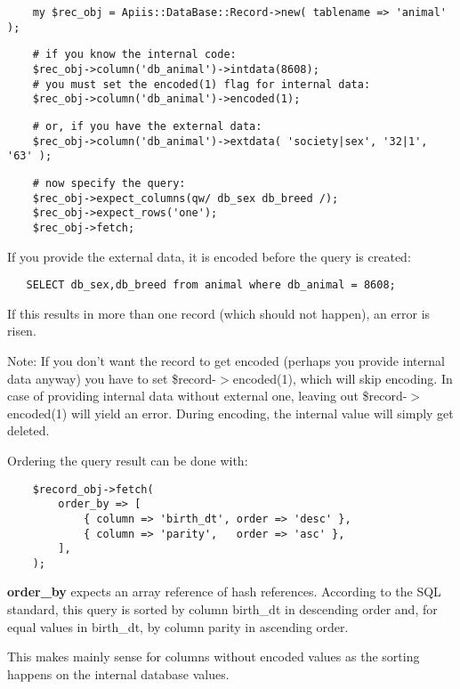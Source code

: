 \begin{verbatim}
    my $rec_obj = Apiis::DataBase::Record->new( tablename => 'animal' );
\end{verbatim}
\begin{verbatim}
    # if you know the internal code:
    $rec_obj->column('db_animal')->intdata(8608);
    # you must set the encoded(1) flag for internal data:
    $rec_obj->column('db_animal')->encoded(1);
\end{verbatim}
\begin{verbatim}
    # or, if you have the external data:
    $rec_obj->column('db_animal')->extdata( 'society|sex', '32|1', '63' );
\end{verbatim}
\begin{verbatim}
    # now specify the query:
    $rec_obj->expect_columns(qw/ db_sex db_breed /);
    $rec_obj->expect_rows('one');
    $rec_obj->fetch;
\end{verbatim}


If you provide the external data, it is encoded before the query is created:

\begin{verbatim}
   SELECT db_sex,db_breed from animal where db_animal = 8608;
\end{verbatim}


If this results in more than one record (which should not happen), an error is
risen.



Note: If you don't want the record to get encoded (perhaps you provide
internal data anyway) you have to set \$record-$>$encoded(1), which will skip
encoding. In case of providing internal data without external one, leaving out
\$record-$>$encoded(1) will yield an error. During encoding, the internal
value will simply get deleted.



Ordering the query result can be done with:

\begin{verbatim}
    $record_obj->fetch(
        order_by => [
            { column => 'birth_dt', order => 'desc' },
            { column => 'parity',   order => 'asc' },
        ],
    );
\end{verbatim}


\textbf{order\_by} expects an array reference of hash references. According to the
SQL standard, this query is sorted by column birth\_dt in descending order and,
for equal values in birth\_dt, by column parity in ascending order.



This makes mainly sense for columns without encoded values as the sorting
happens on the internal database values.

